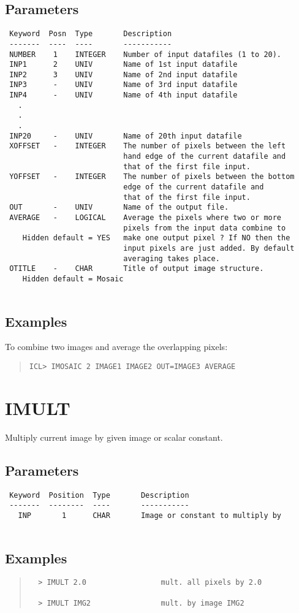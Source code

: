 \documentclass{book}
\renewcommand{\_}{{\tt\char'137}}     %
\begin{document}
\subsection{Parameters}
\begin{verbatim}
 Keyword  Posn  Type       Description
 -------  ----  ----       -----------
 NUMBER    1    INTEGER    Number of input datafiles (1 to 20).
 INP1      2    UNIV       Name of 1st input datafile
 INP2      3    UNIV       Name of 2nd input datafile
 INP3      -    UNIV       Name of 3rd input datafile
 INP4      -    UNIV       Name of 4th input datafile
   .
   .
   .
 INP20     -    UNIV       Name of 20th input datafile
 XOFFSET   -    INTEGER    The number of pixels between the left
                           hand edge of the current datafile and
                           that of the first file input.
 YOFFSET   -    INTEGER    The number of pixels between the bottom
                           edge of the current datafile and
                           that of the first file input.
 OUT       -    UNIV       Name of the output file.
 AVERAGE   -    LOGICAL    Average the pixels where two or more
                           pixels from the input data combine to
    Hidden default = YES   make one output pixel ? If NO then the
                           input pixels are just added. By default
                           averaging takes place.
 OTITLE    -    CHAR       Title of output image structure.
    Hidden default = Mosaic
 
\end{verbatim}\subsection{Examples}
To combine two images and average the overlapping pixels:
\begin{quote}\begin{verbatim}
ICL> IMOSAIC 2 IMAGE1 IMAGE2 OUT=IMAGE3 AVERAGE
\end{verbatim}\end{quote}
\section{IMULT}
Multiply current image by given image or scalar constant.
 
\subsection{Parameters}
\begin{verbatim}
 Keyword  Position  Type       Description
 -------  --------  ----       -----------
   INP       1      CHAR       Image or constant to multiply by
 
\end{verbatim}\subsection{Examples}
\begin{quote}\begin{verbatim}
  > IMULT 2.0                 mult. all pixels by 2.0
 
  > IMULT IMG2                mult. by image IMG2
 \end{verbatim}\end{quote}
\end{document}
